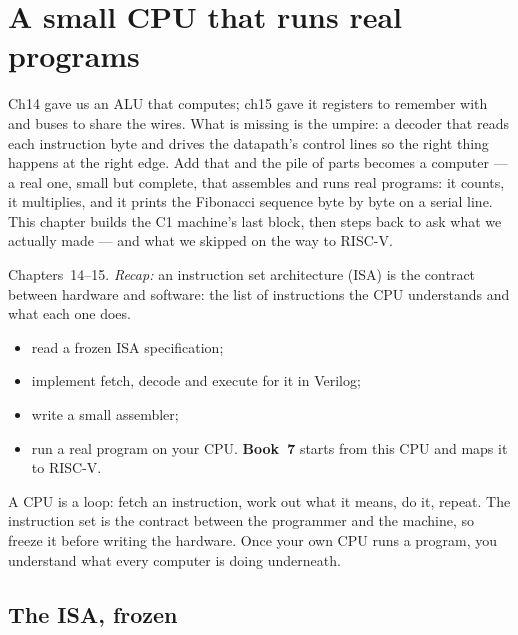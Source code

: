 \chapter{A small CPU that runs real programs}\label{ch:cpu8}

Ch14 gave us an ALU that computes; ch15 gave it registers to remember
with and buses to share the wires. What is missing is the umpire: a
decoder that reads each instruction byte and drives the datapath's
control lines so the right thing happens at the right edge. Add that
and the pile of parts becomes a computer --- a real one, small but
complete, that assembles and runs real programs: it counts, it
multiplies, and it prints the Fibonacci sequence byte by byte on a
serial line. This chapter builds the C1 machine's last block, then
steps back to ask what we actually made --- and what we skipped on
the way to RISC-V.

\begin{rulebox}
Chapters~14--15. \emph{Recap:} an instruction set architecture (ISA) is the contract between hardware and software: the list of instructions the CPU understands and what each one does.
\end{rulebox}
\begin{wins}
\begin{itemize}
\item read a frozen ISA specification;
\item implement fetch, decode and execute for it in Verilog;
\item write a small assembler;
\item run a real program on your CPU. \textbf{Book~7} starts from this CPU and maps it to RISC-V.
\end{itemize}
\end{wins}
\begin{principle}
A CPU is a loop: fetch an instruction, work out what it means, do it, repeat. The instruction set is the contract between the programmer and the machine, so freeze it before writing the hardware. Once your own CPU runs a program, you understand what every computer is doing underneath.
\end{principle}

\section{The ISA, frozen}\label{sec:isa16}

